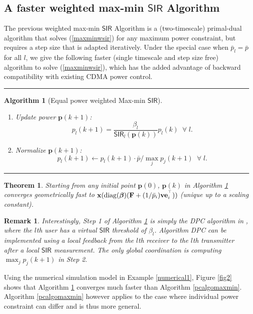 \documentclass[10pt,twocolumn]{IEEEtran}
\newcommand{\0}{\mathbf{0}}
\newcommand{\1}{\mathbf{1}}
\def\diag{\mathop{{\rm diag}}\nolimits}
\newcommand{\trans}{^\top}
\newtheorem{theorem}{Theorem}
\newtheorem{algorithm}{Algorithm}
\newtheorem{remark}{Remark}
\begin{document}
\subsection{A faster weighted max-min $\mathsf{SIR}$ Algorithm}
The previous weighted max-min $\mathsf{SIR}$ Algorithm is a (two-timescale) primal-dual algorithm that solves (\ref{maxminwsir}) for any maximum power constraint, but requires a step size that is adapted iteratively. Under the special case when $\bar{p}_l=\bar{p}$ for all $l$, we give the following faster (single timescale and step size free) algorithm to solve (\ref{maxminwsir}), which has the added advantage of backward compatibility with existing CDMA power control.
\rule{0.49\textwidth}{0.1mm}
\begin{algorithm}[Equal power weighted Max-min $\mathsf{SIR}$]
\label{pcalgomaxminfast}
\hspace{.2in}
\begin{enumerate}
\item Update power $\mathbf{p} (k+1)$:
$$
p_l(k+1) = \frac{\beta_l}{\mathsf{SIR}_l(\mathbf{p}(k))} p_l(k) \;\; \forall \; l.
$$
\item Normalize $\mathbf{p} (k+1)$:
$$
p_l(k+1) \leftarrow p_l (k+1) \cdot \bar{p} /\max_j p_j(k+1) \;\; \forall \; l.
$$
\end{enumerate}
\end{algorithm}
\rule{0.49\textwidth}{0.1mm}
\begin{theorem}
\label{fastmaxminsir}
Starting from any initial point $\mathbf{p}(0)$, $\mathbf{p}(k)$ in Algorithm \ref{pcalgomaxminfast} converges geometrically fast to $\mathbf{x}(\diag(\boldsymbol{\beta})(\mathbf{F}+(1/\bar{p}_i)\mathbf{v}\mathbf{e}_i^{\trans}))$ (unique up to a scaling constant).
\end{theorem}
\begin{remark}
Interestingly, Step 1 of Algorithm \ref{pcalgomaxminfast} is simply the DPC algorithm in \cite{Foschini93}, where the $l$th user has a virtual $\mathsf{SIR}$ threshold of $\beta_l$. Algorithm DPC can be implemented using a local feedback from the $l$th receiver to the $l$th transmitter after a local $\mathsf{SIR}$ measurement. The only global coordination is computing $\max_j p_j(k+1)$ in Step 2.
\end{remark}
Using the numerical simulation model in Example \ref{numerical1}, Figure \ref{fig2} shows that Algorithm \ref{pcalgomaxminfast} converges much faster than Algorithm \ref{pcalgomaxmin}. Algorithm \ref{pcalgomaxmin} however applies to the case where individual power constraint can differ and is thus more general.
\end{document}
